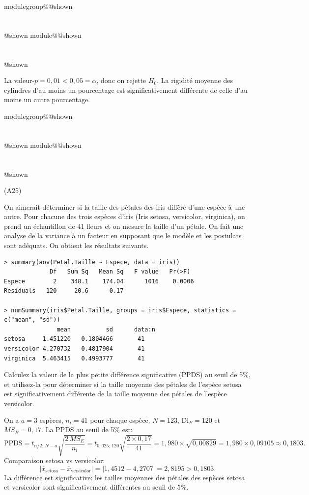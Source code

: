 \documentclass{Evaluation}
\makeatletter
\newcommand{\currentmodulekey}{}
\newcommand{\currentmoduletitle}{}
\newcommand{\currentgroupkey}{}
\newcommand{\currentgrouptitle}{}
\newcommand{\showmoduleifneeded}{%
  \ifx\currentgroupkey\empty\else
    \expandafter\ifx\csname modulegroup@\currentgroupkey @shown\endcsname\relax
      \section*{\currentgrouptitle}%
      \expandafter\gdef\csname modulegroup@\currentgroupkey @shown\endcsname{1}%
    \fi
  \fi
  \expandafter\ifx\csname module@\currentmodulekey @shown\endcsname\relax
    \section*{\currentmoduletitle}%
    \expandafter\gdef\csname module@\currentmodulekey @shown\endcsname{1}%
  \fi
}
\newenvironment{A24}{\showmoduleifneeded}{}
\newenvironment{A25}{\showmoduleifneeded}{}
\makeatother
\begin{document}
\begin{questions}
\begin{A24}
\begin{parts}
\begin{solution}
La valeur-$p = 0{,}01 < 0{,}05 = \alpha$, donc on rejette $H_0$. La rigidité moyenne des cylindres d'au moins un pourcentage est significativement différente de celle d'au moins un autre pourcentage.
\end{solution}

\end{parts}
\end{A24}
\begin{A25}
\question (A25)

On aimerait déterminer si la taille des pétales des iris diffère d'une espèce à une autre. Pour chacune des trois espèces d'iris (Iris setosa, versicolor, virginica), on prend un échantillon de 41 fleurs et on mesure la taille d'un pétale. On fait une analyse de la variance à un facteur en supposant que le modèle et les postulats sont adéquats. On obtient les résultats suivants. 

\begin{verbatim}
> summary(aov(Petal.Taille ~ Espece, data = iris))
             Df   Sum Sq   Mean Sq   F value   Pr(>F)    
Espece        2    348.1    174.04      1016    0.0006
Residuals   120     20.6      0.17  

> numSummary(iris$Petal.Taille, groups = iris$Espece, statistics = c("mean", "sd"))
               mean          sd      data:n
setosa     1.451220   0.1804466       41
versicolor 4.270732   0.4817904       41
virginica  5.463415   0.4993777       41
\end{verbatim}


Calculez la valeur de la plus petite différence significative (PPDS) au seuil de 5\%, et utilisez-la 
pour déterminer si la taille moyenne des pétales de l'espèce setosa est significativement différente de la taille
moyenne des pétales de l'espèce versicolor.

\begin{solution}
On a $a=3$ espèces, $n_i=41$ pour chaque espèce, $N=123$, $\text{Dl}_E=120$ et $MS_E=0{,}17$. La PPDS au seuil de 5\% est:
$$\text{PPDS} = t_{\alpha/2;\,N-a}\sqrt{\frac{2\,MS_E}{n_i}} = t_{0{,}025;\,120}\sqrt{\frac{2 \times 0{,}17}{41}} = 1{,}980 \times \sqrt{0{,}00829} = 1{,}980 \times 0{,}09105 \approx 0{,}1803.$$
Comparaison setosa vs versicolor:
$$|\bar{x}_{\text{setosa}} - \bar{x}_{\text{versicolor}}| = |1{,}4512 - 4{,}2707| = 2{,}8195 > 0{,}1803.$$
La différence est significative: les tailles moyennes des pétales des espèces setosa et versicolor sont significativement différentes au seuil de 5\%.
\end{solution}
\end{A25}



\end{questions}
\end{document}
